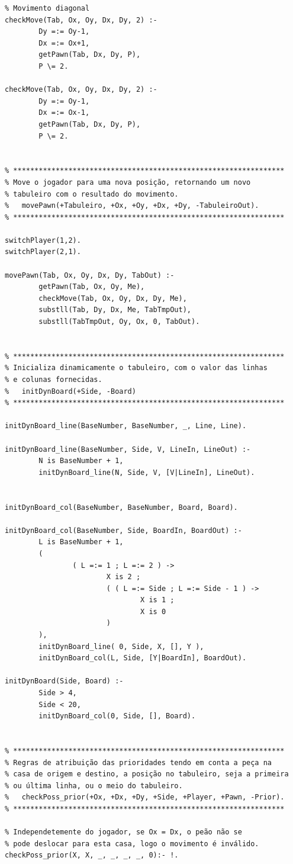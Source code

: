 \documentclass[15pt,a4paper]{article}
\begin{document}
\begin{lstlisting}
% Movimento diagonal
checkMove(Tab, Ox, Oy, Dx, Dy, 2) :-
		Dy =:= Oy-1,
		Dx =:= Ox+1,
		getPawn(Tab, Dx, Dy, P),
		P \= 2.

checkMove(Tab, Ox, Oy, Dx, Dy, 2) :-
		Dy =:= Oy-1,
		Dx =:= Ox-1,
		getPawn(Tab, Dx, Dy, P),
		P \= 2.


% ****************************************************************
% Move o jogador para uma nova posição, retornando um novo
% tabuleiro com o resultado do movimento.
%	movePawn(+Tabuleiro, +Ox, +Oy, +Dx, +Dy, -TabuleiroOut).
% ****************************************************************

switchPlayer(1,2).
switchPlayer(2,1).

movePawn(Tab, Ox, Oy, Dx, Dy, TabOut) :-
		getPawn(Tab, Ox, Oy, Me),
		checkMove(Tab, Ox, Oy, Dx, Dy, Me),
		substll(Tab, Dy, Dx, Me, TabTmpOut),
		substll(TabTmpOut, Oy, Ox, 0, TabOut).
	

% ****************************************************************
% Inicializa dinamicamente o tabuleiro, com o valor das linhas
% e colunas fornecidas.
%	initDynBoard(+Side, -Board)
% ****************************************************************

initDynBoard_line(BaseNumber, BaseNumber, _, Line, Line).

initDynBoard_line(BaseNumber, Side, V, LineIn, LineOut) :-
		N is BaseNumber + 1,
		initDynBoard_line(N, Side, V, [V|LineIn], LineOut).
		
                
initDynBoard_col(BaseNumber, BaseNumber, Board, Board).

initDynBoard_col(BaseNumber, Side, BoardIn, BoardOut) :-
		L is BaseNumber + 1,
		(
				( L =:= 1 ; L =:= 2 ) ->
						X is 2 ;
						( ( L =:= Side ; L =:= Side - 1 ) ->
								X is 1 ;
								X is 0
						)
		),
		initDynBoard_line( 0, Side, X, [], Y ),
		initDynBoard_col(L, Side, [Y|BoardIn], BoardOut).

initDynBoard(Side, Board) :-
		Side > 4,
		Side < 20,
		initDynBoard_col(0, Side, [], Board).
        
        
% ****************************************************************
% Regras de atribuição das prioridades tendo em conta a peça na
% casa de origem e destino, a posição no tabuleiro, seja a primeira
% ou última linha, ou o meio do tabuleiro.
%	checkPoss_prior(+Ox, +Dx, +Dy, +Side, +Player, +Pawn, -Prior).
% ****************************************************************      

% Independetemente do jogador, se Ox = Dx, o peão não se
% pode deslocar para esta casa, logo o movimento é inválido.
checkPoss_prior(X, X, _, _, _, _, 0):- !.


\end{lstlisting}
\end{document}
